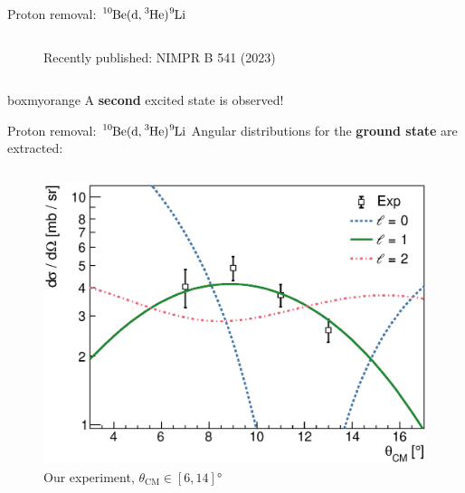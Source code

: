 \documentclass[sans,
frameno, %
mp,
usenames,dvipsnames, %
onlytextwidth, %
t,%
11pt]{beamer}
\newcommand{\iso}[2]{\ce{^{#1}#2}}
\begin{document}
\begin{frame}{Proton removal: $\iso{10}{Be}(\textrm{d}, \iso{3}{He})\iso{9}{Li}$}
\begin{columns}[t]
{\begin{figure}
                \caption{Recently published: NIMPR B 541 (2023)}
            \end{figure}
        }
    \end{columns}

    \begin{beamercolorbox}[sep=1ex,center, rounded=true, wd=0.48\linewidth]{boxmyorange}
        A \textbf{second} excited state is observed!\\
    \end{beamercolorbox}

\end{frame}

\begin{frame}{Proton removal: $\iso{10}{Be}(\textrm{d}, \iso{3}{He})\iso{9}{Li}$}
    Angular distributions for the \textbf{ground state} are extracted:
    \vspace{-\medskipamount}
    \begin{columns}[t]
        {
            \begin{figure}
                \captionsetup{belowskip=-8pt}
                \caption{Our experiment, $\theta_{\textrm{CM}} \in \left[6, 14\right]\unit{\degree}$}
                \includegraphics[width=\linewidth, cfbox=myorange 1pt 0pt 0pt]{figures/Workshop/10Be_d3He_xs.eps}
            \end{figure}

}
\end{columns}
\end{frame}
\end{document}
